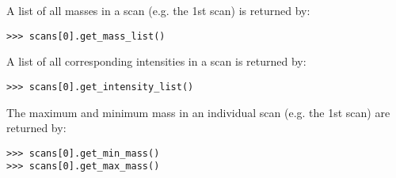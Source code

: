 A list of all masses in a scan (e.g. the 1st scan) is returned by:

\begin{verbatim}
>>> scans[0].get_mass_list()
\end{verbatim}

A list of all corresponding intensities in a scan is returned by:

\begin{verbatim}
>>> scans[0].get_intensity_list()
\end{verbatim}

The maximum and minimum mass in an individual scan (e.g. the 1st scan) are
returned by:

\begin{verbatim}
>>> scans[0].get_min_mass()
>>> scans[0].get_max_mass()
\end{verbatim}
